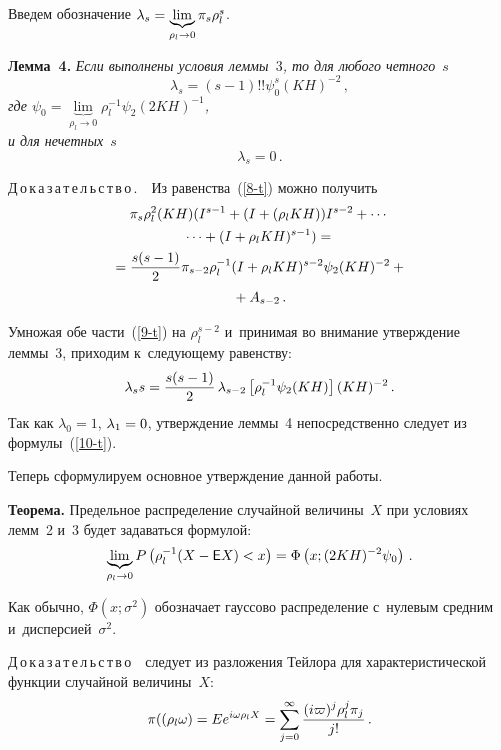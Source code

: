 \begin{multicols}{2}
\smallskip

Введем обозначение  $\lambda_s \hm= \underbrace{\lim}_{\rho_l\rightarrow 0}
\pi_s \rho_l^s$.

\smallskip

\noindent
\textbf{Лемма~4.} \textit{Если выполнены условия леммы~$3$, то
для любого четного~$s$
$$
\lambda_s=(s-1)!!\psi_0^s(KH)^{-2}\,,
$$
где $\psi_0 =\underbrace{\lim}_{\rho_l\rightarrow 0} \rho_l^{-1}\psi_2  (2KH)^{-1}$, \\
и для нечетных}~$s$
 $$
 \lambda_s=0\,.
 $$

\noindent
Д\,о\,к\,а\,з\,а\,т\,е\,л\,ь\,с\,т\,в\,о\,.\ \ Из равенства~(\ref{8-t}) можно получить
\begin{multline}
\pi_{s}\rho_l^2(KH)(I^{s-1}+(I+(\rho_lKH))I^{s-2}+\cdots{}\\
{}\cdots
+(I+\rho_lKH)^{s-1})
={}\\
{}=\displaystyle\frac{\displaystyle s(s-1)\mathstrut}{\displaystyle 2\mathstrut}\pi_{s-2} \rho_l^{-1} (I+\rho_l KH)^{s-2}\psi_{2}
(KH)^{-2}+{}\\
{}+A_{s-2}\,.
\label{9-t}
\end{multline}

Умножая обе части~(\ref{9-t}) на $\rho_l^{s-2}$ и~принимая
во внимание утверждение леммы~3, приходим к~следующему равенству:
\begin{equation}
\lambda_s s = \displaystyle\frac{\displaystyle s(s-1)\mathstrut}{\displaystyle 2\mathstrut} \,\lambda_{s-2}\left[\rho_l^{-1} \psi_{2}(KH)\right] (KH)^{-2}\,.
\label{10-t}
\end{equation}
Так как $\lambda_0=1$,  $\lambda_1\hm=0$, утверждение леммы~4
непосредственно следует из формулы~(\ref{10-t}).

\smallskip

Теперь сформулируем основное утверждение данной работы.

\smallskip

\noindent
\textbf{Теорема.} Предельное распределение случайной величины~$X$ при
условиях лемм~2 и~3 будет  задаваться формулой:
\begin{equation*}
\underbrace{\lim}_{\rho_l\rightarrow 0} P\left(\rho_l^{-1}(X-{\sf E}X)<x\right)
=
\Phi \left(x; (2KH)^{-2}\psi_0\right)\,.
\end{equation*}

Как обычно,  $\Phi (x;\sigma^2)$ обозначает гауссово распределение
с~нулевым средним и~дисперсией~$\sigma^2$.

\smallskip

\noindent
Д\,о\,к\,а\,з\,а\,т\,е\,л\,ь\,с\,т\,в\,о\ \ следует из разложения Тейлора
для характеристической функции случайной величины~$X$:
$$
\pi((\rho_l \omega) = Ee^{i\omega \rho_l X} = \sum\limits_{j=0}^{\infty}\displaystyle\frac{\displaystyle (i\varpi)^j \rho_l^j \pi_j \mathstrut}{\displaystyle j!\mathstrut}\,.
$$


\end{multicols}
